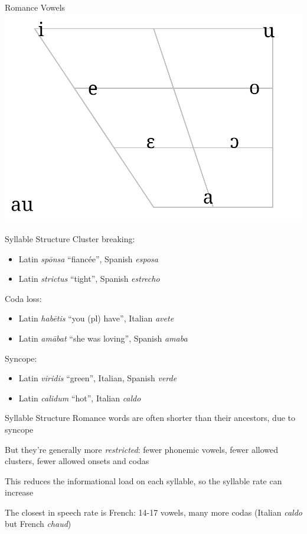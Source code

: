 \documentclass{beamer}
\begin{document}
\begin{frame}{Romance Vowels}
\includegraphics[width=\linewidth]{romance_vowels}
\end{frame}

\begin{frame}{Syllable Structure}
Cluster breaking:
\vspace{-1em}
\begin{itemize}
\item Latin \emph{spōnsa} ``fiancée'', Spanish \emph{esposa}
\item Latin \emph{strictus} ``tight'', Spanish \emph{estrecho}
\end{itemize}

Coda loss:
\vspace{-1em}
\begin{itemize}
\item Latin \emph{habētis} ``you (pl) have'', Italian \emph{avete}
\item Latin \emph{amābat} ``she was loving'', Spanish \emph{amaba}
\end{itemize}

Syncope:
\vspace{-1em}
\begin{itemize}
\item Latin \emph{viridis} ``green'', Italian, Spanish \emph{verde}
\item Latin \emph{calidum} ``hot'', Italian \emph{caldo}
\end{itemize}
\end{frame}

\begin{frame}{Syllable Structure}
Romance words are often shorter than their ancestors, due to syncope

But they're generally more \emph{restricted}: fewer phonemic vowels, fewer allowed clusters, fewer allowed onsets and codas

This reduces the informational load on each syllable, so the syllable rate can increase

The closest in speech rate is French: 14-17 vowels, many more codas (Italian \emph{caldo} but French \emph{chaud})
\end{frame}
\end{document}
